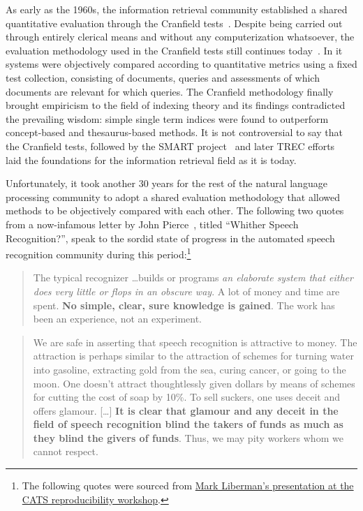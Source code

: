 As early as the 1960s, the information retrieval community established a shared quantitative evaluation through the Cranfield tests~\citep{cleverdon1962report,cleverdon1967cranfield}.
Despite being carried out through entirely clerical means and without any computerization whatsoever, the evaluation methodology used in the Cranfield tests still continues today~\citep{voorhees2007trec}.
In it systems were objectively compared according to quantitative metrics using a fixed test collection, consisting of documents, queries and assessments of which documents are relevant for which queries. 
The Cranfield methodology finally brought empiricism to the field of indexing theory and its findings contradicted the prevailing wisdom: simple single term indices were found to outperform concept-based and thesaurus-based methods.
It is not controversial to say that the Cranfield tests, followed by the SMART project~\citep{salton1965smart} and later TREC efforts~\citep{harman1992overview} laid the foundations for the information retrieval field as it is today.

Unfortunately, it took another 30 years for the rest of the natural language processing community to adopt a shared evaluation methodology that allowed methods to be objectively compared with each other.
The following two quotes from a now-infamous letter by John Pierce~\citep{pierce1970whither}, titled ``Whither Speech Recognition?'', speak to the sordid state of progress in the automated speech recognition community during this period:\footnote{%
The following quotes were sourced from \href{https://pdfs.semanticscholar.org/presentation/b719/c67e53c008c68e8978c2e97643cf131bb61c.pdf}{Mark Liberman's presentation at the CATS reproducibility workshop}.
}

\begin{quote}
  The typical recognizer \dots builds or programs \textit{an elaborate system that either does very little or flops in an obscure way}. A lot of money and time are spent. \textbf{No simple, clear, sure knowledge is gained}. The work has been an experience, not an experiment.
\end{quote}
\begin{quote}
We are safe in asserting that speech recognition is attractive to money. The attraction is perhaps similar to the attraction of schemes for turning water into gasoline, extracting gold from the sea, curing cancer, or going to the moon. 
One doesn't attract thoughtlessly given dollars by means of schemes for cutting the cost of soap by 10\%.
To sell suckers, one uses deceit and offers glamour. [\dots] \textbf{It is clear that glamour and any deceit in the field of speech recognition blind the takers of funds as much as they blind the givers of funds}. Thus, we may pity workers whom we cannot respect.
\end{quote}


